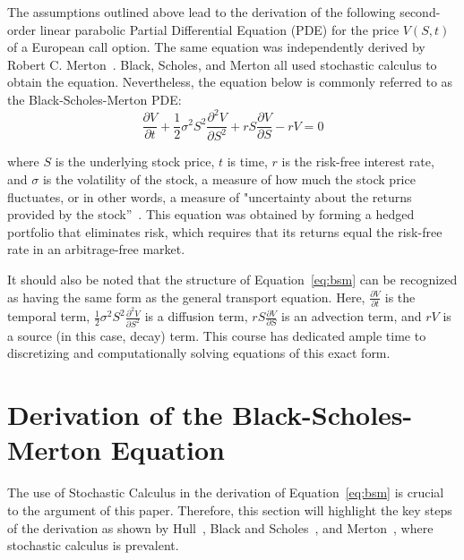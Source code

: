 \documentclass[12pt, onecolumn, journal]{IEEEtran}
\begin{document}
The assumptions outlined above lead to the derivation of the following second-order linear parabolic Partial Differential Equation (PDE) for the price $V(S,t)$ of a European call option. The same equation was independently derived by Robert C. Merton~\cite{Merton1973}. Black, Scholes, and Merton all used stochastic calculus to obtain the equation. Nevertheless, the equation below is commonly referred to as the Black-Scholes-Merton PDE:
\begin{equation}
    \frac{\partial V}{\partial t} + \frac{1}{2} \sigma^2 S^2 \frac{\partial^2 V}{\partial S^2} + rS \frac{\partial V}{\partial S} - rV = 0
    \label{eq:bsm}
\end{equation}

where $S$ is the underlying stock price, $t$ is time, $r$ is the risk-free interest rate, and $\sigma$ is the volatility of the stock, a measure of how much the stock price fluctuates, or in other words, a measure of "uncertainty about the returns provided by the stock”~\cite{Hull2022}. This equation was obtained by forming a hedged portfolio that eliminates risk, which requires that its returns equal the risk-free rate in an arbitrage-free market.

It should also be noted that the structure of Equation~\ref{eq:bsm} can be recognized as having the same form as the general transport equation. Here, $\frac{\partial V}{\partial t}$ is the temporal term, $\frac{1}{2} \sigma^2 S^2 \frac{\partial^2 V}{\partial S^2}$ is a diffusion term, $rS \frac{\partial V}{\partial S}$ is an advection term, and $rV$ is a source (in this case, decay) term. This course has dedicated ample time to discretizing and computationally solving equations of this exact form.

\section{Derivation of the Black-Scholes-Merton Equation}

The use of Stochastic Calculus in the derivation of Equation~\ref{eq:bsm} is crucial to the argument of this paper. Therefore, this section will highlight the key steps of the derivation as shown by Hull~\cite{Hull2022}, Black and Scholes~\cite{BlackScholes1973}, and Merton~\cite{Merton1973}, where stochastic calculus is prevalent.
\end{document}
